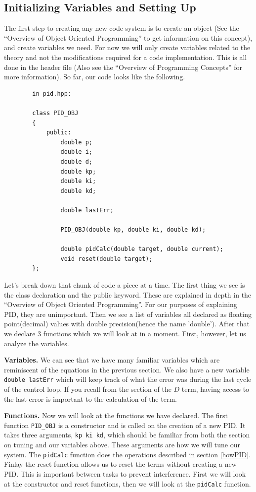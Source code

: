 \documentclass[12pt]{article}
\begin{document}
\subsection{Initializing Variables and Setting Up}
    The first step to creating any new code system is to create an object (See the ``Overview of Object Oriented Programming'' to get information on this concept), and create variables we need. For now we will only create variables related to the theory and not the modifications required for a code implementation. This is all done in the header file (Also see the ``Overview of Programming Concepts'' for more information). So far, our code looks like the following.

    \begin{verbatim}
        in pid.hpp:

        class PID_OBJ
        {
            public:
                double p;
                double i;
                double d;
                double kp;
                double ki;
                double kd;

                double lastErr;

                PID_OBJ(double kp, double ki, double kd);

                double pidCalc(double target, double current);
                void reset(double target);
        };
    \end{verbatim}

    Let's break down that chunk of code a piece at a time. The first thing we see is the class declaration and the public keyword. These are explained in depth in the ``Overview of Object Oriented Programming''. For our purposes of explaining PID, they are unimportant. Then we see a list of variables all declared as floating point(decimal) values with double precision(hence the name 'double'). After that we declare 3 functions which we will look at in a moment. First, however, let us analyze the variables.

   \textbf{Variables.} We can see that we have many familiar variables which are reminiscent of the equations in the previous section. We also have a new variable \verb|double lastErr| which will keep track of what the error was during the last cycle of the control loop. If you recall from the section of the $D$ term, having access to the last error is important to the calculation of the term.

    \textbf{Functions.} Now we will look at the functions we have declared. The first function \verb|PID_OBJ| is a constructor and is called on the creation of a new PID. It takes three arguments, \verb|kp ki kd|, which should be familiar from both the section on tuning and our variables above. These arguments are how we will tune our system. The \verb|pidCalc| function does the operations described in section \ref{howPID}. Finlay the reset function allows us to reset the terms without creating a new PID. This is important between tasks to prevent interference. First we will look at the constructor and reset functions, then we will look at the \verb|pidCalc| function.
\end{document}
